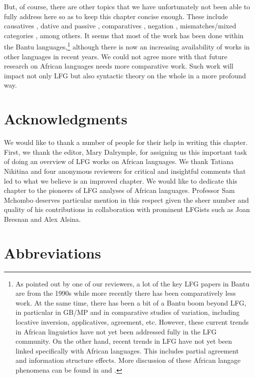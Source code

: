 \documentclass[output=paper,hidelinks]{langscibook}
\begin{document}
But, of course, there are other topics that we have unfortunately not been able to fully address here so as to keep this chapter concise enough. These include causatives \citep{Alsina1992}, dative and passive \citep{Mchombo1980}, comparatives \citep{Beerman:Comparatives}, negation \citep{Bond2016}, mismatches/mixed categories \citep{Bresnan:Mismatches,BresMuga06,Morimoto:LFG2002}, among others. It seems that most of the work has been done within the Bantu languages,\footnote{As pointed out by one of our reviewers, a lot of the key LFG papers in Bantu are from the 1990s while more recently there has been comparatively less work. At the same time, there has been a bit of a Bantu boom beyond LFG, in particular in GB/MP and in comparative studies of variation, including locative inversion, applicatives, agreement, etc. However, these current trends in African linguistics have not yet been addressed fully in the LFG community. On the other hand, recent trends in LFG have not yet been linked specifically with African languages. This includes partial agreement \citep{sadler16} and information structure effects. More discussion of these African langage phenomena can be found in \citet{DowningMarten2019} and \citet{AgwueleBodomo}.} although there is now an increasing availability of works in other languages in recent years. We could not agree more with \citet{Henderson2011} that future research on African languages needs more comparative work. Such work will impact not only LFG but also syntactic theory on the whole in a more profound way.

\section*{Acknowledgments}

We would like to thank a number of people for their help in writing this chapter. First, we thank the editor, Mary Dalrymple, for assigning us this important task of doing an overview of LFG works on African languages. We thank Tatiana Nikitina and four anonymous reviewers for critical and insightful comments that led to what we believe is an improved chapter. We would like to dedicate this chapter to the pioneers of LFG analyses of African languages. Professor Sam Mchombo deserves particular mention in this respect given the sheer number and quality of his contributions in collaboration with prominent LFGists such as Joan Bresnan and Alex Alsina.

\section*{Abbreviations}
\end{document}
